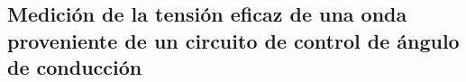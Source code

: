   \subsection{Medición de la tensión eficaz de una onda proveniente de un circuito de control de ángulo de conducción}
